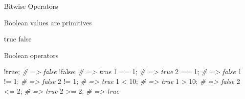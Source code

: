 \documentclass[ignorenonframetext,]{beamer}
\newenvironment{Shaded}{}{}
\newcommand{\FloatTok}[1]{\textcolor[rgb]{0.25,0.63,0.44}{{#1}}}
\newcommand{\CommentTok}[1]{\textcolor[rgb]{0.38,0.63,0.69}{\textit{{#1}}}}
\newcommand{\NormalTok}[1]{{#1}}
\begin{document}
\begin{frame}[fragile]{Bitwise Operators}

\begin{Shaded}
\end{Shaded}

\end{frame}

\begin{frame}[fragile]{Boolean values are primitives}

\begin{Shaded}
\begin{Highlighting}[]
\NormalTok{true}
\NormalTok{false}
\end{Highlighting}
\end{Shaded}

\end{frame}

\begin{frame}[fragile]{Boolean operators}

\begin{Shaded}
\begin{Highlighting}[]
\NormalTok{!true; }\CommentTok{# => false}
\NormalTok{!false; }\CommentTok{# => true}
\FloatTok{1} \NormalTok{== }\FloatTok{1}\NormalTok{; }\CommentTok{# => true}
\FloatTok{2} \NormalTok{== }\FloatTok{1}\NormalTok{; }\CommentTok{# => false}
\FloatTok{1} \NormalTok{!= }\FloatTok{1}\NormalTok{; }\CommentTok{# => false}
\FloatTok{2} \NormalTok{!= }\FloatTok{1}\NormalTok{; }\CommentTok{# => true}
\FloatTok{1} \NormalTok{< }\FloatTok{10}\NormalTok{; }\CommentTok{# => true}
\FloatTok{1} \NormalTok{> }\FloatTok{10}\NormalTok{; }\CommentTok{# => false}
\FloatTok{2} \NormalTok{<= }\FloatTok{2}\NormalTok{; }\CommentTok{# => true}
\FloatTok{2} \NormalTok{>= }\FloatTok{2}\NormalTok{; }\CommentTok{# => true}
\end{Highlighting}
\end{Shaded}

\end{frame}
\end{document}
